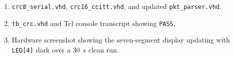 \documentclass[11pt,letterpaper]{article}
\begin{document}
\begin{tcolorbox}[deliverable={Lab Handout 2-E Deliverable}]
	\begin{enumerate}[leftmargin=1.2em]
		\item \texttt{crc8\_serial.vhd}, \texttt{crc16\_ccitt.vhd}, and updated \texttt{pkt\_parser.vhd}.
		\item \texttt{tb\_crc.vhd} and Tcl console transcript showing \texttt{PASS}.
		\item Hardware screenshot showing the seven-segment display updating with \texttt{LED[4]} dark over a 30~s clean run.
	\end{enumerate}
\end{tcolorbox}

\printhandoutglossary
\end{document}
